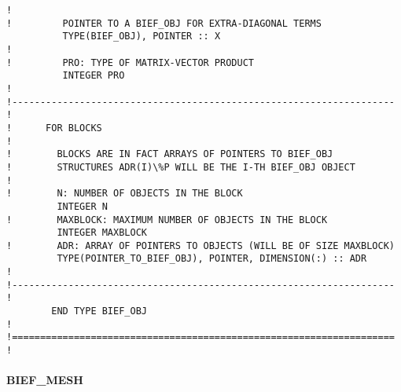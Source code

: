 \begin{lstlisting}[language=TelFortran]
!
!         POINTER TO A BIEF_OBJ FOR EXTRA-DIAGONAL TERMS
          TYPE(BIEF_OBJ), POINTER :: X
!
!         PRO: TYPE OF MATRIX-VECTOR PRODUCT
          INTEGER PRO
!
!--------------------------------------------------------------------
!
!      FOR BLOCKS
!
!        BLOCKS ARE IN FACT ARRAYS OF POINTERS TO BIEF_OBJ
!        STRUCTURES ADR(I)\%P WILL BE THE I-TH BIEF_OBJ OBJECT
!
!        N: NUMBER OF OBJECTS IN THE BLOCK
         INTEGER N
!        MAXBLOCK: MAXIMUM NUMBER OF OBJECTS IN THE BLOCK
         INTEGER MAXBLOCK
!        ADR: ARRAY OF POINTERS TO OBJECTS (WILL BE OF SIZE MAXBLOCK)
         TYPE(POINTER_TO_BIEF_OBJ), POINTER, DIMENSION(:) :: ADR
!
!--------------------------------------------------------------------
!
        END TYPE BIEF_OBJ
!
!====================================================================
!
\end{lstlisting}

\paragraph{BIEF\_MESH}

